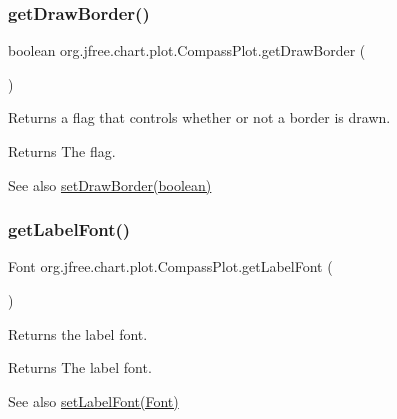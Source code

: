 \subsubsection{\texorpdfstring{get\+Draw\+Border()}{getDrawBorder()}}
{\footnotesize\ttfamily boolean org.\+jfree.\+chart.\+plot.\+Compass\+Plot.\+get\+Draw\+Border (\begin{DoxyParamCaption}{ }\end{DoxyParamCaption})}

Returns a flag that controls whether or not a border is drawn.

\begin{DoxyReturn}{Returns}
The flag.
\end{DoxyReturn}
\begin{DoxySeeAlso}{See also}
\mbox{\hyperlink{classorg_1_1jfree_1_1chart_1_1plot_1_1_compass_plot_a51c6d6fab150718d76e187dbcee91c78}{set\+Draw\+Border(boolean)}} 
\end{DoxySeeAlso}
\mbox{\label{classorg_1_1jfree_1_1chart_1_1plot_1_1_compass_plot_a0b53e720564c3d6b745d25244fc55752}} 
\subsubsection{\texorpdfstring{get\+Label\+Font()}{getLabelFont()}}
{\footnotesize\ttfamily Font org.\+jfree.\+chart.\+plot.\+Compass\+Plot.\+get\+Label\+Font (\begin{DoxyParamCaption}{ }\end{DoxyParamCaption})}

Returns the label font.

\begin{DoxyReturn}{Returns}
The label font.
\end{DoxyReturn}
\begin{DoxySeeAlso}{See also}
\mbox{\hyperlink{classorg_1_1jfree_1_1chart_1_1plot_1_1_compass_plot_af688b26ccadd9c7c02e8976b1f07fa41}{set\+Label\+Font(\+Font)}} 
\end{DoxySeeAlso}
\mbox{\label{classorg_1_1jfree_1_1chart_1_1plot_1_1_compass_plot_a39f33f879528d43e4597f3038cf0eab5}} 
